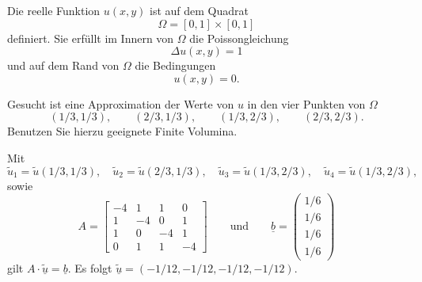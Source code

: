 Die reelle Funktion $u(x,y)$ ist auf dem Quadrat
\[
\Omega = [0, 1] \times [0,1]
\]
definiert. Sie erfüllt im Innern von $\Omega$ die Poissongleichung
\[
 \Delta u(x,y) = 1
\]
und auf dem Rand von $\Omega$ die Bedingungen
\[
u(x,y) = 0.
\]

\vspace{2mm}

Gesucht ist eine Approximation der Werte von $u$ in den vier Punkten von $\Omega$
\[
(1/3,1/3), \qquad  (2/3,1/3), \qquad (1/3,2/3), \qquad  (2/3,2/3).
\]
Benutzen Sie hierzu geeignete Finite Volumina.  

\begin{loesung}
Mit 
\[
\tilde u_1 = \tilde u(1/3,1/3),
\quad
\tilde u_2 = \tilde u(2/3,1/3),
\quad
\tilde u_3 = \tilde u(1/3,2/3),
\quad
\tilde u_4 = \tilde u(1/3,2/3), 
\]
sowie 
\[
A = \left[\begin{array}{rrrr} 
-4 & 1  & 1 & 0 \\
 1 & -4 & 0 & 1 \\
 1 & 0 & -4 & 1 \\ 
 0 & 1 & 1  & -4 \end{array}\right]
\qquad
\text{und}
\qquad
\underline{b} =  \left(\begin{array}{r} 1/6 \\ 1/6 \\ 1/6 \\ 1/6 \end{array}\right) 
\]
gilt $A \cdot \underline{\tilde u} = \underline{b}$.
Es folgt $\underline{\tilde u} = (-1/12, -1/12, -1/12, -1/12).$
\end{loesung}

